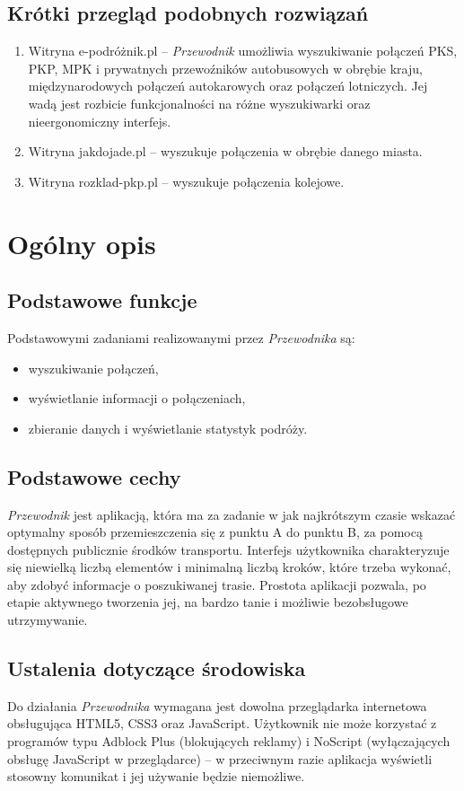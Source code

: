 \documentclass[12pt,a4paper]{report}
\begin{document}
\subsection{Krótki przegląd podobnych rozwiązań}
\begin{enumerate}
	\item Witryna e-podróżnik.pl -- \emph{Przewodnik} umożliwia wyszukiwanie połączeń PKS, PKP, MPK i prywatnych przewoźników autobusowych w obrębie kraju, międzynarodowych połączeń autokarowych oraz połączeń lotniczych. Jej wadą jest rozbicie funkcjonalności na różne wyszukiwarki oraz nieergonomiczny interfejs.
	\item Witryna jakdojade.pl -- wyszukuje połączenia w obrębie danego miasta.
	\item Witryna rozklad-pkp.pl -- wyszukuje połączenia kolejowe.
\end{enumerate}
\newpage
\section{Ogólny opis}
\subsection{Podstawowe funkcje}
	Podstawowymi zadaniami realizowanymi przez \emph{Przewodnika} są:
	\begin{itemize}
	 	\item wyszukiwanie połączeń,
	 	\item wyświetlanie informacji o połączeniach,
	 	\item zbieranie danych i wyświetlanie statystyk podróży.
	\end{itemize}
\subsection{Podstawowe cechy}
	\emph{Przewodnik} jest aplikacją, która ma za zadanie w jak najkrótszym czasie wskazać optymalny sposób przemieszczenia się z punktu A do punktu B, za pomocą dostępnych publicznie środków transportu. Interfejs użytkownika charakteryzuje się niewielką liczbą elementów i minimalną liczbą kroków, które trzeba wykonać, aby zdobyć informacje o poszukiwanej trasie. Prostota aplikacji pozwala, po etapie aktywnego tworzenia jej, na bardzo tanie i możliwie bezobsługowe utrzymywanie.
\subsection{Ustalenia dotyczące środowiska}
	Do działania \emph{Przewodnika} wymagana jest dowolna przeglądarka internetowa obsługująca HTML5, CSS3 oraz JavaScript. Użytkownik nie może korzystać z programów typu Adblock Plus (blokujących reklamy) i NoScript (wyłączających obsługę JavaScript w przeglądarce) -- w przeciwnym razie aplikacja wyświetli stosowny komunikat i jej używanie będzie niemożliwe.
\end{document}
